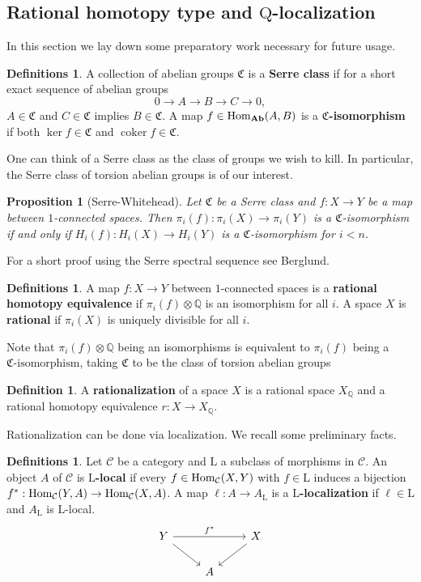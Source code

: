 \documentclass[psamsfonts]{amsart}
\newtheorem{prop}[thm]{Proposition}
\theoremstyle{definition}
\newtheorem{defn}[thm]{Definition}
\newtheorem{defns}[thm]{Definitions}
\theoremstyle{remark}
\newcommand{\Q}{\mathbb{Q}}
\newcommand{\Ab}{\mathbf{Ab}}
\newcommand{\Hom}{\textup{Hom}}
\DeclareMathOperator{\coker}{coker}
\numberwithin{equation}{section}
\begin{document}
\subsection{Rational homotopy type and $\mathrm{Q}$-localization}

In this section we lay down some preparatory work necessary for future usage.

\begin{defns}
A collection of abelian groups $\mathfrak{C}$ is a \textbf{Serre class} if for a short exact sequence of abelian groups
\[0\to A\to B\to C\to0,\] $A\in\mathfrak{C}$ and $C\in\mathfrak{C}$ implies $B\in\mathfrak{C}$. A map $f\in\Hom_{\Ab}(A,B)$ is a \textbf{$\mathfrak{C}$-isomorphism} if both $\ker f\in\mathfrak{C}$ and $\coker f\in\mathfrak{C}$.
\end{defns}

One can think of a Serre class as the class of groups we wish to kill. In particular, the Serre class of torsion abelian groups is of our interest.

\begin{prop}[Serre-Whitehead]
Let $\mathfrak{C}$ be a Serre class and $f:X\to Y$ be a map between $1$-connected spaces. Then $\pi_i(f):\pi_i(X)\to\pi_i(Y)$ is a $\mathfrak{C}$-isomorphism if and only if $H_i(f):H_i(X)\to H_i(Y)$ is a $\mathfrak{C}$-isomorphism for $i<n$.
\end{prop}

For a short proof using the Serre spectral sequence see Berglund\cite{Berglund}.

\begin{defns}
A map $f:X\to Y$ between $1$-connected spaces is a \textbf{rational homotopy equivalence} if $\pi_i(f)\otimes\Q$ is an isomorphism for all $i$. A space $X$ is \textbf{rational} if $\pi_i(X)$ is uniquely divisible for all $i$.
\end{defns}

Note that $\pi_i(f)\otimes\Q$ being an isomorphisms is equivalent to $\pi_i(f)$ being a ${\mathfrak{C}\textrm{-isomorphism}}$, taking $\mathfrak{C}$ to be the class of torsion abelian groups

\begin{defn}
A \textbf{rationalization} of a space $X$ is a rational space $X_\Q$ and a rational homotopy equivalence $r:X\to X_\Q$.
\end{defn}

Rationalization can be done via localization. We recall some preliminary facts.

\begin{defns}
Let $\mathcal{C}$ be a category and $\mathrm{L}$ a subclass of morphisms in $\mathcal{C}$. An object $A$ of $\mathcal{C}$ is \textbf{$\mathrm{L}$-local} if every $f\in\Hom_\mathcal{C}(X,Y)$ with $f\in\mathrm{L}$ induces a bijection $f^\ast:\Hom_\mathcal{C}(Y,A)\to\Hom_\mathcal{C}(X,A)$. A map $\ell:A\to A_\mathrm{L}$ is a \textbf{$\mathrm{L}$-localization} if $\ell\in\mathrm{L}$ and $A_\mathrm{L}$ is $\mathrm{L}$-local.
\[\begin{tikzcd}
Y\arrow[dr]\arrow[rr,"f^\ast"]&&X\arrow[dl]\\
&A
\end{tikzcd}\]
\end{defns}
\end{document}
